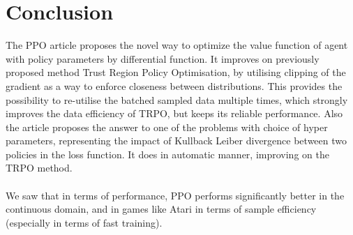 \documentclass{article}
\begin{document}
\section{Conclusion}
The PPO article proposes the novel way to optimize the value function of agent with policy parameters by differential function. It improves on previously proposed method Trust Region Policy Optimisation, by utilising clipping of the gradient as a way to enforce closeness between distributions. This provides the possibility to re-utilise the batched sampled data multiple times, which strongly improves the data efficiency of TRPO, but keeps its reliable performance. Also the article proposes the answer to one of the problems with choice of hyper parameters, representing the impact of Kullback Leiber divergence between two policies in the loss function. It does in automatic manner, improving on the TRPO method.
\\ \\
We saw that in terms of performance, PPO performs significantly better in the continuous domain, and in games like Atari in terms of sample efficiency (especially in terms of fast training).

\newpage


\end{document}
